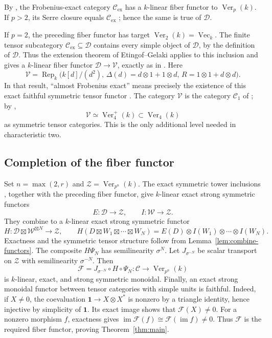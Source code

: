 By \cite[Theorem~8.1]{EtingofOstrikFrobenius}, the Frobenius-exact
category $\mathcal C_{\mathrm{ex}}$ has a $k$-linear fiber functor
to $\operatorname{Ver}_p(k)$.  If $p>2$, its Serre closure equals
$\mathcal C_{\mathrm{ex}}$
\cite[Corollary~9.5]{EtingofOstrikFrobenius}; hence the same is true
of $\mathcal D$.

If $p=2$, the preceding fiber functor has target
$\operatorname{Ver}_2(k)=\operatorname{Vec}_k$. The finite tensor
subcategory $\mathcal C_{\mathrm{ex}}\subseteq\mathcal D$ contains
every simple object of $\mathcal D$, by the definition of $\mathcal D$.
Thus the extension theorem of Etingof--Gelaki
\cite[Theorem~2.21(2)]{EtingofGelaki2021} applies to this inclusion and
gives a $k$-linear fiber functor $\mathcal D\to\mathcal V$, exactly as
in \cite[Corollary~9.8]{EtingofOstrikFrobenius}. Here
\[
 \mathcal V=\operatorname{Rep}_k\bigl(k[d]/(d^2),\,
 \Delta(d)=d\otimes1+1\otimes d,\,R=1\otimes1+d\otimes d\bigr).
\]
In that result, ``almost Frobenius exact'' means precisely the existence
of this exact faithful symmetric tensor functor
\cite[Definition~8.13]{EtingofOstrikFrobenius}.
The category $\mathcal V$ is the category $\mathcal C_1$ of
\cite[Introduction]{BensonEtingof2019}; by
\cite[Theorem~4.5(iii)]{BEO2023},
\[
 \mathcal V\simeq\operatorname{Ver}_4^+(k)
 \subset\operatorname{Ver}_4(k)
\]
as symmetric tensor categories.  This is the only additional level
needed in characteristic two.

\subsection{Completion of the fiber functor}
\label{subsec:completion}
Set $n=\max(2,r)$ and $\mathcal Z=\operatorname{Ver}_{p^n}(k)$.
The exact symmetric tower inclusions
\cite[Theorem~4.34]{BEO2023}, together with the preceding
fiber functor, give $k$-linear exact strong symmetric functors
\[
 E:\mathcal D\longrightarrow\mathcal Z,
 \qquad I:\mathcal W\longrightarrow\mathcal Z.
\]
They combine to a $k$-linear exact strong symmetric functor
\begin{equation}\label{eq:combined-functor}
 H:\mathcal D\boxtimes\mathcal W^{\boxtimes N}\longrightarrow\mathcal Z,
 \qquad
 H(D\boxtimes W_1\boxtimes\cdots\boxtimes W_N)
 =E(D)\otimes I(W_1)\otimes\cdots\otimes I(W_N).
\end{equation}
Exactness and the symmetric tensor structure follow from
Lemma~\ref{lem:combine-functors}.  The composite $H\Psi_N$ has semilinearity $\sigma^N$.
Let $J_{\sigma^{-N}}$ be scalar transport on $\mathcal Z$ with
semilinearity $\sigma^{-N}$.  Then
\[
 \mathcal F=J_{\sigma^{-N}}\circ H\circ\Psi_N:
 \mathcal C\longrightarrow\operatorname{Ver}_{p^n}(k)
\]
is $k$-linear, exact, and strong symmetric monoidal.
Finally, an exact strong monoidal functor between tensor categories
with simple units is faithful.  Indeed, if $X\ne0$, the coevaluation
$\mathbf1\to X\otimes X^*$ is nonzero by a triangle identity, hence
injective by simplicity of $\mathbf1$.  Its exact image shows that
$\mathcal F(X)\ne0$.  For a nonzero morphism $f$, exactness gives
$\operatorname{im}\mathcal F(f)\cong \mathcal F(\operatorname{im}f)\ne0$.
Thus $\mathcal F$ is the required fiber functor, proving Theorem~\ref{thm:main}.
